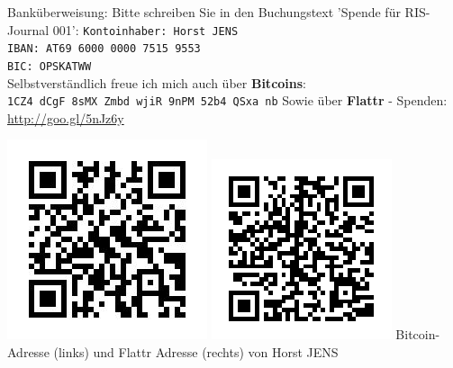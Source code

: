 Banküberweisung: Bitte schreiben Sie in den Buchungstext 'Spende für RIS-Journal 001':
\texttt{Kontoinhaber: Horst JENS \\
IBAN: AT69 6000 0000 7515 9553\\
BIC: OPSKATWW} \\
Selbstverständlich freue ich mich auch über \textbf{Bitcoins}:\\
\texttt{1CZ4 dCgF 8sMX Zmbd wjiR 9nPM 52b4 QSxa nb}
Sowie über \textbf{Flattr} - Spenden: \url{http://goo.gl/5nJz6y}
\begin{center}
\includegraphics[width=0.49\linewidth]{editorial/editorial-bitcoin-qr.jpg} 
\includegraphics[width=0.49\linewidth]{editorial/editorial-flattr-qr.png}
\footnotesize{Bitcoin-Adresse (links) und Flattr Adresse (rechts) von Horst JENS}
\end{center}


